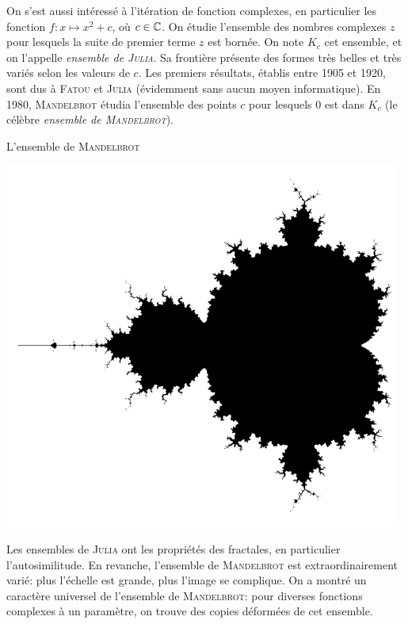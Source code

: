 {On s'est aussi intéressé à l'itération de fonction complexes, en particulier les fonction $f : x \mapsto x^2 + c$, où $c \in \mathbb{C}$. On étudie l'ensemble des nombres complexes $z$ pour lesquels la suite de premier terme $z$ est bornée. On note $K_c$ cet ensemble, et on l'appelle \emph{ensemble de \textsc{Julia}}. Sa frontière présente des formes très belles et très variés selon les valeurs de $c$. Les premiers résultats, établis entre 1905 et 1920, sont dus à \textsc{Fatou} et \textsc{Julia} (évidemment sans aucun moyen informatique). En 1980, \textsc{Mandelbrot} étudia l'ensemble des points $c$ pour lesquels $0$ est dans $K_c$ (le célèbre \emph{ensemble de \textsc{Mandelbrot}}). 
\begin{marginfigure}[-2cm]
    \centering
    \caption*{\centering L'ensemble de \textsc{Mandelbrot}}
    \includegraphics[scale=0.2]{images/ensemble_de_mandelbrot.png}
\end{marginfigure}
Les ensembles de \textsc{Julia} ont les propriétés des fractales, en particulier l'autosimilitude. En revanche, l'ensemble de \textsc{Mandelbrot} est extraordinairement varié: plus l'échelle est grande, plus l'image se complique. On a montré un caractère universel de l'ensemble de \textsc{Mandelbrot}: pour diverses fonctions complexes à un paramètre, on trouve des copies déformées de cet ensemble. 
}

